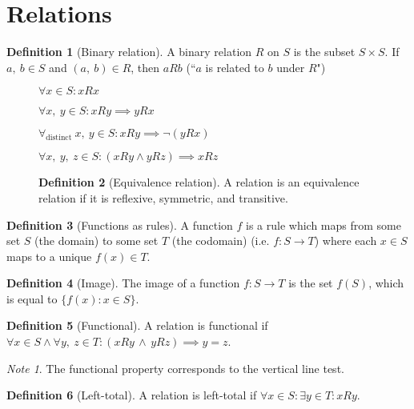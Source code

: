 \documentclass{article}
\theoremstyle{plain}
\numberwithin{theorem}{subsection}
\theoremstyle{definition}
\newtheorem{definition}{Definition}[section]
\numberwithin{definition}{subsection}
\theoremstyle{remark}
\newtheorem{note}{Note}[section]
\numberwithin{note}{subsection}
\begin{document}
\section{Relations}
\begin{definition}[Binary relation]
	A binary relation $R$ on $S$ is the subset $S\times S$.
	If $a, \: b \in S$ and  $(a, \: b) \in R$,
	then $aRb$ (``$a$ is related to $b$ under $R$")
\end{definition}
%
\begin{figure}[H]
\begin{mdframed}[style=exampledefault,frametitle={Relation Properties}]
\begin{description}[style=sameline]
	\item[Reflexive]
		$\forall x \in S : xRx$
	\item[Symmetric]
		$\forall x,\: y \in S : xRy \implies yRx$
	\item[Antisymmetric]
		$\forall_\text{distinct} \: x,\: y \in S : xRy \implies \neg (yRx)$
	\item[Transitive]
		$\forall x,\: y, \: z \in S : (xRy \land yRz) \implies xRz$
\end{description}
\begin{definition}[Equivalence relation]
    A relation is an equivalence relation if it is
    reflexive, symmetric, and transitive.
\end{definition}
\end{mdframed}
\end{figure}
%
\begin{definition}[Functions as rules]
    A function $f$ is a rule which maps
    from some set $S$ (the domain)
    to some set $T$ (the codomain)
    (i.e. $f: S \to T$) where each $x \in S$ maps to a unique $f(x) \in T$.
\end{definition}
\begin{definition}[Image]
    The image of a function $f: S \to T$ is the set $f(S)$,
    which is equal to $\{f(x):x \in S\}$.
\end{definition}
\begin{definition}[Functional]
    A relation is functional if
    $\forall x \in S \land \forall y,\: z \in T
        : (xRy \, \land \, yRz) \implies y=z$.
\end{definition}
\begin{note}
    The functional property corresponds to the vertical line test.
\end{note}
\begin{definition}[Left-total]
    A relation is left-total if
    $\forall x \in S : \exists y \in T : xRy$.
\end{definition}
\end{document}
